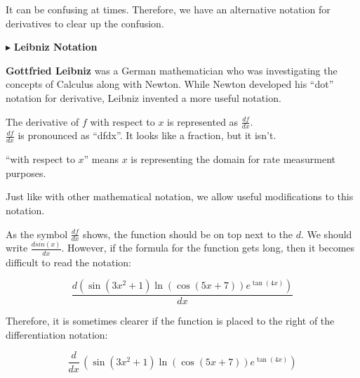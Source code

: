 \documentclass{ximera}
\begin{document}
It can be confusing at times.  Therefore, we have an alternative notation for derivatives to clear up the confusion.



$\blacktriangleright$  \textbf{\textcolor{purple!85!blue}{Leibniz Notation}}


\textbf{Gottfried Leibniz} was a German mathematician who was investigating the concepts of Calculus along with Newton.  While Newton developed his ``dot'' notation for derivative, Leibniz invented a more useful notation.


The derivative of $f$ with respect to $x$ is represented as $\frac{df}{dx}$. \\

$\frac{df}{dx}$ is pronounced as ``dfdx''.  It looks like a fraction, but it isn't.


``with respect to $x$'' means $x$ is representing the domain for rate measurment purposes. 



\begin{notation}


Just like with other mathematical notation, we allow useful modifications to this notation.



As the symbol $\frac{df}{dx}$ shows, the function should be on top next to the $d$.    We should write $\frac{d sin(x)}{dx}$.  However, if the formula for the function gets long, then it becomes difficult to read the notation:

\[
\frac{d (\sin(3x^2+1)\ln(\cos(5x+7))e^{\tan(4x)})}{dx}
\]


Therefore, it is sometimes clearer if the function is placed to the right of the differentiation notation:




\[
\frac{d}{dx} \, (\sin(3x^2+1)\ln(\cos(5x+7))e^{\tan(4x)})
\]






\end{notation}
\end{document}
